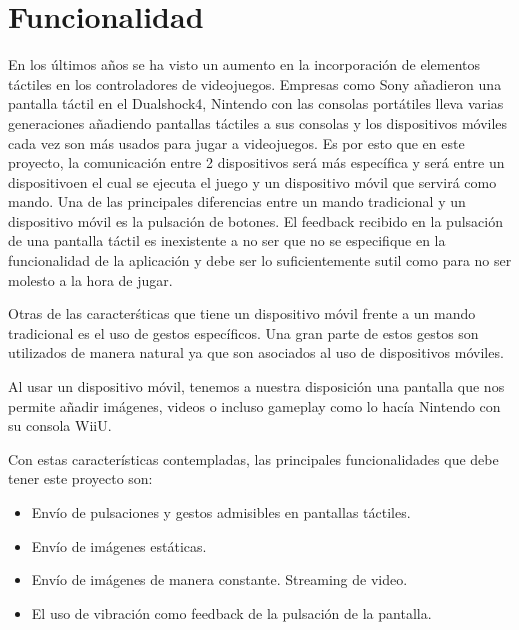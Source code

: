 \section{Funcionalidad}

En los \'ultimos a\~nos se ha visto un aumento en la incorporaci\'on de elementos t\'actiles en los controladores de videojuegos. Empresas como Sony a\~nadieron una pantalla t\'actil en el Dualshock4, Nintendo con las consolas port\'atiles lleva varias generaciones a\~nadiendo pantallas t\'actiles a sus consolas y los dispositivos m\'oviles cada vez son m\'as usados para jugar a videojuegos.
Es por esto que en este proyecto, la comunicaci\'on entre 2 dispositivos ser\'a m\'as espec\'ifica y ser\'a entre un dispositivoen el cual se ejecuta el juego y un dispositivo m\'ovil que servir\'a como mando. Una de las principales diferencias entre un mando tradicional y un dispositivo m\'ovil es la pulsaci\'on de botones. El feedback recibido en la pulsaci\'on de una pantalla t\'actil es inexistente a no ser que no se especifique en la funcionalidad de la aplicaci\'on y debe ser lo suficientemente sutil como para no ser molesto a la hora de jugar.

Otras de las caracter\'sticas que tiene un dispositivo m\'ovil frente a un mando tradicional es el uso de gestos espec\'ificos. Una gran parte de estos gestos son utilizados de manera natural ya que son asociados al uso de dispositivos m\'oviles. 

Al usar un dispositivo m\'ovil, tenemos a nuestra disposici\'on una pantalla que nos permite a\~nadir im\'agenes, videos o incluso gameplay como lo hac\'ia Nintendo con su consola WiiU.

Con estas caracter\'isticas contempladas, las principales funcionalidades que debe tener este proyecto son:

\begin {itemize}
\item Env\'io de pulsaciones y gestos admisibles en pantallas t\'actiles.
\item Env\'io de im\'agenes est\'aticas.
\item Env\'io de im\'agenes de manera constante. Streaming de video.
\item El uso de vibraci\'on como feedback de la pulsaci\'on de la pantalla.
\end {itemize}

